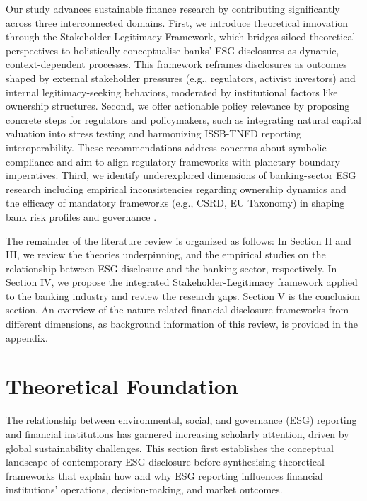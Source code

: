 \documentclass[
  authoryear]{elsarticle}
\begin{document}
Our study advances sustainable finance research by contributing
significantly across three interconnected
domains.\hspace{0pt}\hspace{0pt} First, we introduce theoretical
innovation through the Stakeholder-Legitimacy Framework, which bridges
siloed theoretical perspectives \citep{ECCLES2012} to holistically
conceptualise banks' ESG disclosures as dynamic, context-dependent
processes. This framework reframes disclosures as outcomes shaped by
external stakeholder pressures (e.g., regulators, activist investors)
and internal legitimacy-seeking behaviors, moderated by institutional
factors like ownership structures. Second, we offer actionable policy
relevance by proposing concrete steps for regulators and policymakers,
such as integrating natural capital valuation into stress testing and
harmonizing ISSB-TNFD reporting interoperability. These recommendations
address concerns about symbolic compliance \citep{SMITH2022} and aim to
align regulatory frameworks with planetary boundary imperatives. Third,
we identify underexplored dimensions of banking-sector ESG research
including empirical inconsistencies regarding ownership dynamics and the
efficacy of mandatory frameworks (e.g., CSRD, EU Taxonomy) in shaping
bank risk profiles and governance \citep{ESRB2016}.

The remainder of the literature review is organized as follows: In
Section II and III, we review the theories underpinning, and the
empirical studies on the relationship between ESG disclosure and the
banking sector, respectively. In Section IV, we propose the integrated
Stakeholder-Legitimacy framework applied to the banking industry and
review the research gaps. Section V is the conclusion section. An
overview of the nature-related financial disclosure frameworks from
different dimensions, as background information of this review, is
provided in the appendix.

\section{Theoretical Foundation}\label{theoretical-foundation}

The relationship between environmental, social, and governance (ESG)
reporting and financial institutions has garnered increasing scholarly
attention, driven by global sustainability challenges. This section
first establishes the conceptual landscape of contemporary ESG
disclosure before synthesising theoretical frameworks that explain how
and why ESG reporting influences financial institutions' operations,
decision-making, and market outcomes.
\end{document}
